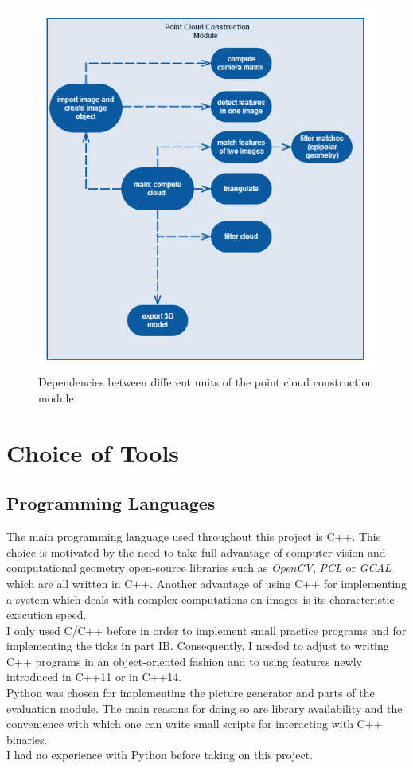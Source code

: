 \documentclass[12pt,a4paper,twoside,openright]{report}
\begin{document}
\begin{figure}
\centerline{\includegraphics[scale=0.75]{figs/dependencies.png}}
\caption{Dependencies between different units of the point cloud construction module}
\end{figure}


\section{Choice of Tools}

\subsection{Programming Languages}
The main programming language used throughout this project is C++. This choice is motivated by the need to take full advantage of computer vision and computational geometry open-source libraries such as \emph{OpenCV}, \emph{PCL} or \emph{GCAL} which are all written in C++. Another advantage of using C++ for implementing a system which deals with complex computations on images is its characteristic execution speed.\\
I only used C/C++ before in order to implement small practice programs and for implementing the ticks in part IB. Consequently, I needed to adjust to writing C++ programs in an object-oriented fashion and to using features newly introduced in C++11 or in C++14.\\
\linebreak
Python was chosen for implementing the picture generator and parts of the evaluation module. The main reasons for doing so are library availability and the convenience with which one can write small scripts for interacting with C++ binaries.\\
I had no experience with Python before taking on this project.   
\end{document}

